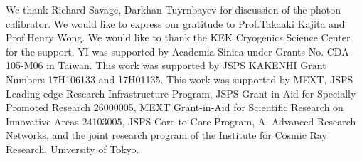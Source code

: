 \documentclass[A4]{spie}  %
\begin{document}
We thank Richard Savage, Darkhan Tuyrnbayev for discussion of the photon calibrator. We would like to express our gratitude to Prof.Takaaki Kajita and Prof.Henry Wong. We would like to thank the KEK Cryogenics Science Center for the support. YI was supported by Academia Sinica under Grants No. CDA-105-M06 in Taiwan. This work was supported by JSPS KAKENHI Grant Numbers 17H106133 and 17H01135. This work was supported by MEXT, JSPS Leading-edge Research Infrastructure Program, JSPS Grant-in-Aid for Specially Promoted
Research 26000005, MEXT Grant-in-Aid for Scientific Research on
Innovative Areas 24103005, JSPS Core-to-Core Program, A. Advanced
Research Networks, and the joint research program of the Institute for
Cosmic Ray Research, University of Tokyo.


\end{document}

